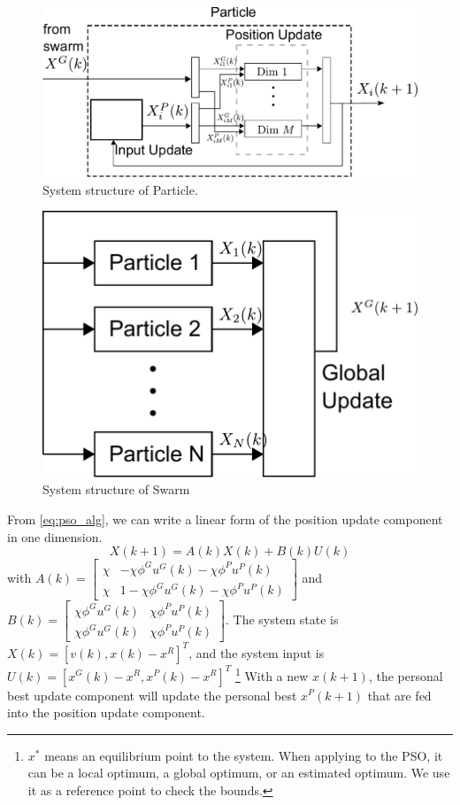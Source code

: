 \begin{figure}
\centering
\includegraphics[width=0.85\linewidth]{./fig/sys_flow.pdf}
\caption{System structure of Particle.}
\label{fig:sys_flow}
\end{figure}

\begin{figure}
\centering
\includegraphics[width=0.6\linewidth]{./fig/pso_sys_flow.pdf}
\caption{System structure of Swarm}
\label{fig:pso_sys_flow}
\end{figure}

From \eqref{eq:pso_alg}, we can write a linear form of the position update component in one dimension.
\begin{equation}
\label{eq:pso_up_linalg_simp}
X(k+1) = A(k) X(k) + B(k) U(k)
\end{equation}
with
$ A(k) = \begin{bmatrix}
\chi & - \chi \phi^{G} u^{G}(k) - \chi \phi^{P} u^{P}(k)
\\ 
\chi & 1 - \chi \phi^{G} u^{G}(k) - \chi \phi^{P} u^{P}(k)
\end{bmatrix} $
and
$ B(k) = \begin{bmatrix}
\chi \phi^{G} u^{G}(k) & \chi \phi^{P} u^{P}(k)
\\ 
\chi \phi^{G} u^{G}(k) & \chi \phi^{P} u^{P}(k)
\end{bmatrix} $.
The system state is $ X(k) = [ v(k), x(k) - x^{R} ]^{T} $, and the system input is $ U(k) = [ x^{G}(k) - x^{R} , x^{P}(k) - x^{R} ]^{T} $
\footnote{$ x^{*} $ means an equilibrium point to the system.
When applying to the PSO, it can be a local optimum, a global optimum, or an estimated optimum.
We use it as a reference point to check the bounds.}
With a new $ x(k+1) $, the personal best update component will update the personal best $ x^{P}(k+1) $ that are fed into the position update component.


